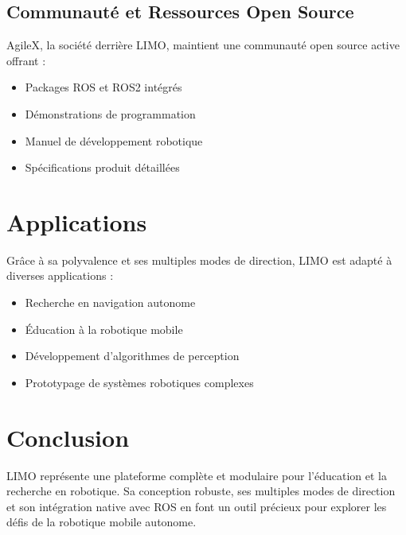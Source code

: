 \subsection{Communauté et Ressources Open Source}
AgileX, la société derrière LIMO, maintient une communauté open source active offrant :
\begin{itemize}
    \item Packages ROS et ROS2 intégrés
    \item Démonstrations de programmation
    \item Manuel de développement robotique
    \item Spécifications produit détaillées
\end{itemize}

\section{Applications}

Grâce à sa polyvalence et ses multiples modes de direction, LIMO est adapté à diverses applications :
\begin{itemize}
    \item Recherche en navigation autonome
    \item Éducation à la robotique mobile
    \item Développement d'algorithmes de perception
    \item Prototypage de systèmes robotiques complexes
\end{itemize}

\section{Conclusion}

LIMO représente une plateforme complète et modulaire pour l'éducation et la recherche en robotique. Sa conception robuste, ses multiples modes de direction et son intégration native avec ROS en font un outil précieux pour explorer les défis de la robotique mobile autonome.
